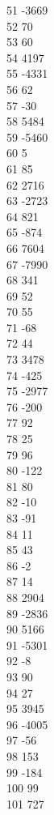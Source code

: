 { 51	-3669 \\
 52	70 \\
 53	60 \\
 54	4197 \\
 55	-4331 \\
 56	62 \\
 57	-30 \\
 58	5484 \\
 59	-5460 \\
 60	5 \\
 61	85 \\
 62	2716 \\
 63	-2723 \\
 64	821 \\
 65	-874 \\
 66	7604 \\
 67	-7990 \\
 68	341 \\
 69	52 \\
 70	55 \\
 71	-68 \\
 72	44 \\
 73	3478 \\
 74	-425 \\
 75	-2977 \\
 76	-200 \\
 77	92 \\
 78	25 \\
 79	96 \\
 80	-122 \\
 81	80 \\
 82	-10 \\
 83	-91 \\
 84	11 \\
 85	43 \\
 86	-2 \\
 87	14 \\
 88	2904 \\
 89	-2836 \\
 90	5166 \\
 91	-5301 \\
 92	-8 \\
 93	90 \\
 94	27 \\
 95	3945 \\
 96	-4005 \\
 97	-56 \\
 98	153 \\
 99	-184 \\
 100	99 \\
 101	727 \\
}
